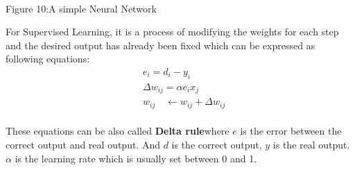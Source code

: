 \documentclass[a4paper,12pt]{article}
\begin{document}
\begin{spacing}{2}
\begin{center}
\\
Figure 10:{A simple Neural Network}
\end{center}
For Supervised Learning, it is a process of modifying the weights for each step and the desired output has already been fixed which can be expressed as following equations:
\begin{align}
&e_{i}=d_{i}-y_{i}\\
&\Delta w_{ij}=\alpha e_{i} x_{j}\\
&w_{ij} \quad \leftarrow w_{ij}+ \Delta w_{ij}
\end{align}
\paragraph{ }These equations can be also called \textbf{Delta rule}where $e$ is the error between the correct output and real output. And $d $ is the correct output, $y$ is the real output. $\alpha$ is the learning rate which is usually set between 0 and 1.\\


\end{spacing}
\end{document}
